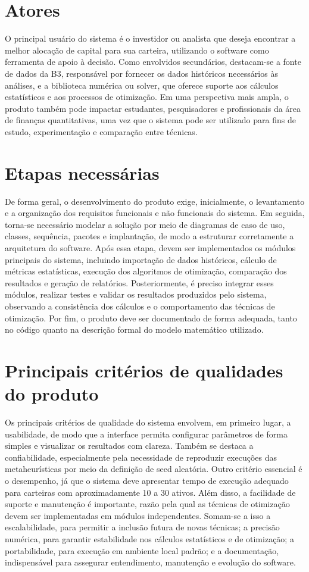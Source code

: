 \documentclass[
	12pt,				%
	openright,			%
	oneside,			    %
	a4paper,				%
	english,			%
	french,			%
	spanish,			%
	brazil			%
	]{abntex2}
\begin{document}
\section{Atores}
O principal usuário do sistema é o investidor ou analista que deseja encontrar a melhor alocação de capital para sua carteira, utilizando o software como ferramenta de apoio à decisão. Como envolvidos secundários, destacam-se a fonte de dados da B3, responsável por fornecer os dados históricos necessários às análises, e a biblioteca numérica ou solver, que oferece suporte aos cálculos estatísticos e aos processos de otimização. Em uma perspectiva mais ampla, o produto também pode impactar estudantes, pesquisadores e profissionais da área de finanças quantitativas, uma vez que o sistema pode ser utilizado para fins de estudo, experimentação e comparação entre técnicas. 

\section{Etapas necessárias}
De forma geral, o desenvolvimento do produto exige, inicialmente, o levantamento e a organização dos requisitos funcionais e não funcionais do sistema. Em seguida, torna-se necessário modelar a solução por meio de diagramas de caso de uso, classes, sequência, pacotes e implantação, de modo a estruturar corretamente a arquitetura do software. Após essa etapa, devem ser implementados os módulos principais do sistema, incluindo importação de dados históricos, cálculo de métricas estatísticas, execução dos algoritmos de otimização, comparação dos resultados e geração de relatórios. Posteriormente, é preciso integrar esses módulos, realizar testes e validar os resultados produzidos pelo sistema, observando a consistência dos cálculos e o comportamento das técnicas de otimização. Por fim, o produto deve ser documentado de forma adequada, tanto no código quanto na descrição formal do modelo matemático utilizado.


\section{Principais critérios de qualidades do produto}
Os principais critérios de qualidade do sistema envolvem, em primeiro lugar, a usabilidade, de modo que a interface permita configurar parâmetros de forma simples e visualizar os resultados com clareza. Também se destaca a confiabilidade, especialmente pela necessidade de reproduzir execuções das metaheurísticas por meio da definição de seed aleatória. Outro critério essencial é o desempenho, já que o sistema deve apresentar tempo de execução adequado para carteiras com aproximadamente 10 a 30 ativos. Além disso, a facilidade de suporte e manutenção é importante, razão pela qual as técnicas de otimização devem ser implementadas em módulos independentes. Somam-se a isso a escalabilidade, para permitir a inclusão futura de novas técnicas; a precisão numérica, para garantir estabilidade nos cálculos estatísticos e de otimização; a portabilidade, para execução em ambiente local padrão; e a documentação, indispensável para assegurar entendimento, manutenção e evolução do software.
\end{document}
